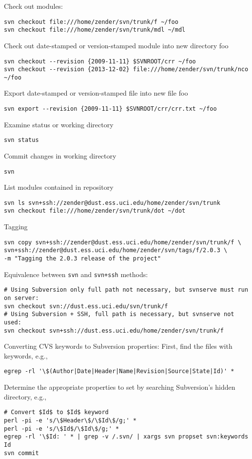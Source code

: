 \documentclass[12pt,twoside]{article}
\begin{document}
Check out modules:
\begin{verbatim}
svn checkout file:///home/zender/svn/trunk/f ~/foo
svn checkout file:///home/zender/svn/trunk/mdl ~/mdl
\end{verbatim}
Check out date-stamped or version-stamped module into new directory foo
\begin{verbatim}
svn checkout --revision {2009-11-11} $SVNROOT/crr ~/foo
svn checkout --revision {2013-12-02} file:///home/zender/svn/trunk/nco ~/foo
\end{verbatim}
Export date-stamped or version-stamped file into new file foo
\begin{verbatim}
svn export --revision {2009-11-11} $SVNROOT/crr/crr.txt ~/foo
\end{verbatim}
Examine status or working directory
\begin{verbatim}
svn status
\end{verbatim}
Commit changes in working directory
\begin{verbatim}
svn 
\end{verbatim}
List modules contained in repository
\begin{verbatim}
svn ls svn+ssh://zender@dust.ess.uci.edu/home/zender/svn/trunk
svn checkout file:///home/zender/svn/trunk/dot ~/dot
\end{verbatim}
Tagging
\begin{verbatim}
svn copy svn+ssh://zender@dust.ess.uci.edu/home/zender/svn/trunk/f \
svn+ssh://zender@dust.ess.uci.edu/home/zender/svn/tags/f/2.0.3 \
-m "Tagging the 2.0.3 release of the project" 
\end{verbatim}
Equivalence between \texttt{svn} and \texttt{svn+ssh} methods:
\begin{verbatim}
# Using Subversion only full path not necessary, but svnserve must run on server:
svn checkout svn://dust.ess.uci.edu/svn/trunk/f
# Using Subversion + SSH, full path is necessary, but svnserve not used:
svn checkout svn+ssh://dust.ess.uci.edu/home/zender/svn/trunk/f
\end{verbatim}

Converting CVS keywords to Subversion properties:
First, find the files with keywords, e.g., 
\begin{verbatim}
egrep -rl '\$(Author|Date|Header|Name|Revision|Source|State|Id)' *
\end{verbatim}
Determine the appropriate properties to set by searching
Subversion's hidden  directory, e.g.,
\begin{verbatim}
# Convert $Id$ to $Id$ keyword
perl -pi -e 's/\$Header\$/\$Id\$/g;' *
perl -pi -e 's/\$Id$/\$Id\$/g;' *
egrep -rl '\$Id: ' * | grep -v /.svn/ | xargs svn propset svn:keywords Id
svn commit
\end{verbatim}
\end{document}
